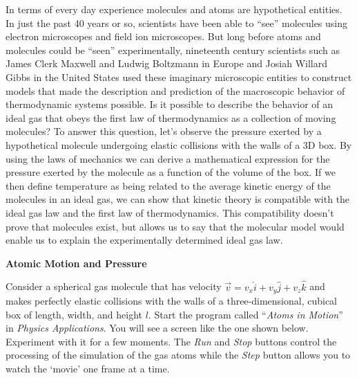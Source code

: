 In terms of every day experience molecules and atoms are hypothetical
entities. In just the past 40 years or so, scientists have been able
to ``see'' molecules using electron microscopes and
field ion microscopes. But long before atoms and molecules could be
``seen'' experimentally, nineteenth century scientists
such as James Clerk Maxwell and Ludwig Boltzmann in Europe and Josiah
Willard Gibbs in the United States used these imaginary microscopic
entities to construct models that made the description and prediction
of the macroscopic behavior of thermodynamic systems possible. Is
it possible to describe the behavior of an ideal gas that obeys the
first law of thermodynamics as a collection of moving molecules? To
answer this question, let's observe the pressure exerted by a hypothetical
molecule undergoing elastic collisions with the walls of a 3D box.
By using the laws of mechanics we can derive a mathematical expression
for the pressure exerted by the molecule as a function of the volume
of the box. If we then define temperature as being related to the
average kinetic energy of the molecules in an ideal gas, we can show
that kinetic theory is compatible with the ideal gas law and the first
law of thermodynamics. This compatibility doesn't prove that molecules
exist, but allows us to say that the molecular model would enable
us to explain the experimentally determined ideal gas law.

\textbf{Atomic Motion and Pressure}

Consider a spherical gas molecule that has velocity 
$\overrightarrow{v}=v_{x} \hat{i}+v_{y}  \hat{j} + v_z\hat k$ and
makes perfectly elastic collisions with the walls of a three-dimensional, cubical
box of length, width, and height $l$.  Start the program called ``\textit{Atoms
in Motion}'' in \textit{Physics Applications}.  
You will see a screen
like the one shown below. Experiment with it for a few moments. 
The \textit{Run} and \textit{Stop} buttons control the processing of the 
simulation of the gas atoms while the \textit{Step} button allows you to watch the
`movie' one frame at a time.



